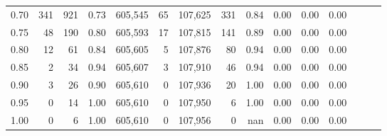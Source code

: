 \begin{tabular}{rrrrrrrrrrrrrrr}
0.70 &      341 &     921 &  0.73 &  605,545 &       65 &  107,625 &      331 &  0.84 &  0.00 &  0.00 &      0.00 \\
0.75 &       48 &     190 &  0.80 &  605,593 &       17 &  107,815 &      141 &  0.89 &  0.00 &  0.00 &      0.00 \\
0.80 &       12 &      61 &  0.84 &  605,605 &        5 &  107,876 &       80 &  0.94 &  0.00 &  0.00 &      0.00 \\
0.85 &        2 &      34 &  0.94 &  605,607 &        3 &  107,910 &       46 &  0.94 &  0.00 &  0.00 &      0.00 \\
0.90 &        3 &      26 &  0.90 &  605,610 &        0 &  107,936 &       20 &  1.00 &  0.00 &  0.00 &      0.00 \\
0.95 &        0 &      14 &  1.00 &  605,610 &        0 &  107,950 &        6 &  1.00 &  0.00 &  0.00 &      0.00 \\
1.00 &        0 &       6 &  1.00 &  605,610 &        0 &  107,956 &        0 &   nan &  0.00 &  0.00 &      0.00 \\
\bottomrule
\end{tabular}
